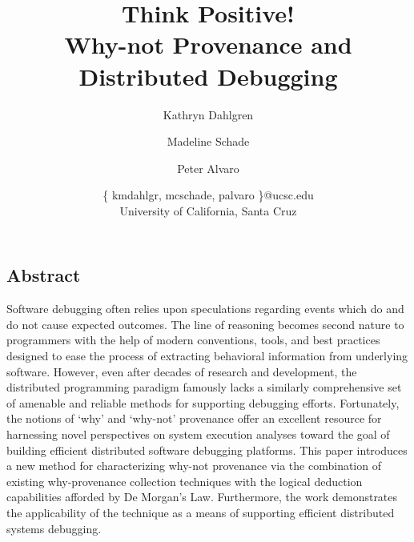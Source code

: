 \documentclass[letterpaper,twocolumn,10pt]{article}
\begin{document}
\date{}

\title{\Large \bf Think Positive! \\ Why-not Provenance and Distributed Debugging }

\author{
{\rm Kathryn Dahlgren}
 \and
 {\rm Madeline Schade}
 \and
 {\rm Peter Alvaro}
  \and
\{ kmdahlgr, mcschade, palvaro \}@ucsc.edu \\
 University of California, Santa Cruz
} %

\maketitle


\subsection*{Abstract}
Software debugging often relies upon speculations regarding events which do and do not cause expected outcomes. The line of reasoning becomes second nature to programmers with the help of modern conventions, tools, and best practices designed to ease the process of extracting behavioral information from underlying software. However, even after decades of research and development, the distributed programming paradigm famously lacks a similarly comprehensive set of amenable and reliable methods for supporting debugging efforts. Fortunately, the notions of `why' and `why-not' provenance offer an excellent resource for harnessing novel perspectives on system execution analyses toward the goal of building efficient distributed software debugging platforms. This paper introduces a new method for characterizing why-not provenance via the combination of existing why-provenance collection techniques with the logical deduction capabilities afforded by De Morgan's Law. Furthermore, the work demonstrates the applicability of the technique as a means of supporting efficient distributed systems debugging.






\end{document}
